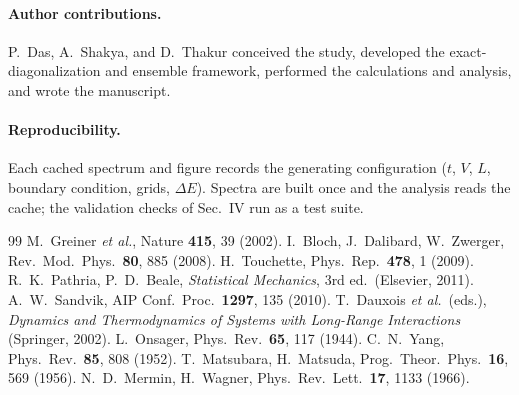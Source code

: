 \documentclass[twocolumn,10pt]{article}
\begin{document}
\paragraph{Author contributions.} P.\ Das, A.\ Shakya, and D.\ Thakur conceived
the study, developed the exact-diagonalization and ensemble framework, performed
the calculations and analysis, and wrote the manuscript.

\paragraph{Reproducibility.} Each cached spectrum and figure records the
generating configuration ($t$, $V$, $L$, boundary condition, grids, $\Delta E$).
Spectra are built once and the analysis reads the cache; the validation checks of
Sec.~IV run as a test suite.

\begin{thebibliography}{99}
\small
{} M.~Greiner \emph{et al.}, Nature \textbf{415}, 39 (2002).
 I.~Bloch, J.~Dalibard, W.~Zwerger, Rev.\ Mod.\ Phys.\ \textbf{80}, 885 (2008).
 H.~Touchette, Phys.\ Rep.\ \textbf{478}, 1 (2009).
 R.~K.~Pathria, P.~D.~Beale, \emph{Statistical Mechanics}, 3rd ed.\ (Elsevier, 2011).
 A.~W.~Sandvik, AIP Conf.\ Proc.\ \textbf{1297}, 135 (2010).
 T.~Dauxois \emph{et al.}\ (eds.), \emph{Dynamics and Thermodynamics of Systems with Long-Range Interactions} (Springer, 2002).
 L.~Onsager, Phys.\ Rev.\ \textbf{65}, 117 (1944).
 C.~N.~Yang, Phys.\ Rev.\ \textbf{85}, 808 (1952).
 T.~Matsubara, H.~Matsuda, Prog.\ Theor.\ Phys.\ \textbf{16}, 569 (1956).
 N.~D.~Mermin, H.~Wagner, Phys.\ Rev.\ Lett.\ \textbf{17}, 1133 (1966).
\end{thebibliography}
\end{document}
